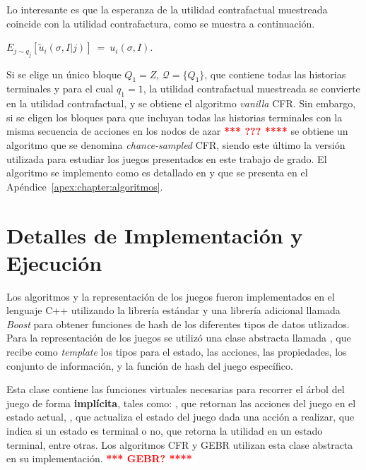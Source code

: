 Lo interesante es que la esperanza de la utilidad contrafactual muestreada coincide con la utilidad contrafactura, como se muestra a continuación.

\begin{theorem}[\textcolor{red}{\bf **** REF ****}]
\label{theo:esperanza-MCCFR}
$E_{j \sim q_j} [\tilde{u}_i(\sigma, I | j)]\ =\ u_i(\sigma, I)$.
\end{theorem}

Si se elige un único bloque $Q_1=Z$, $\mathcal{Q} = \{Q_1\}$, que contiene todas las historias terminales y para el cual $q_1=1$, la utilidad contrafactual muestreada se convierte en la utilidad contrafactual, y se obtiene el algoritmo \textit{vanilla} CFR. Sin embargo, si se eligen los bloques para que incluyan todas las historias terminales con la misma secuencia de acciones en los nodos de azar \textcolor{red}{\bf **** ??? ****} se obtiene un algoritmo que se denomina \textit{chance-sampled} CFR, siendo este último la versión utilizada para estudiar los juegos presentados en este trabajo de grado. El algoritmo se implemento como es detallado en \cite{bib:introductionCFR} y que se presenta en el Apéndice~\ref{apex:chapter:algoritmos}.


\section{Detalles de Implementación y Ejecución}

Los algoritmos y la representación de los juegos fueron implementados en el lenguaje C++ utilizando la librería estándar y una librería adicional llamada \textit{Boost} \cite{bib:boost} para obtener funciones de hash de los diferentes tipos de datos utlizados. Para la representación de los juegos se utilizó una clase abstracta llamada , que recibe como \textit{template} los tipos para el estado, las acciones, las propiedades, los conjunto de información, y la función de hash del juego específico.

Esta clase contiene las funciones virtuales necesarias para recorrer el árbol del juego de forma \textbf{implícita}, tales como: , que retornan las acciones del juego en el estado actual, , que actualiza el estado del juego dada una acción a realizar,  que indica si un estado es terminal o no,  que retorna la utilidad en un estado terminal, entre otras. Los algoritmos CFR y GEBR utilizan esta clase abstracta en su implementación. \textcolor{red}{\bf **** GEBR? ****}

